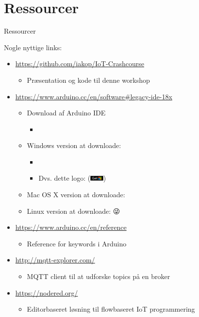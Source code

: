 \documentclass[aspectratio=169]{beamer}
\begin{document}
\section{Ressourcer}
\begin{frame}{Ressourcer}
	\begin{textBox}
	Nogle nyttige links:
		\begin{itemize}
			\item \url{https://github.com/iakop/IoT-Crashcourse}
			\begin{itemize}
				\item Præsentation og kode til denne workshop
			\end{itemize}
			\item \url{https://www.arduino.cc/en/software\#legacy-ide-18x}
			\begin{itemize}
				\item Download af Arduino IDE 
				\begin{itemize}
					\item {}
				\end{itemize}
				\item Windows version at downloade:  
				\begin{itemize}
					\item {}
					\item Dvs.  dette logo: (\includegraphics[height=8pt, keepaspectratio=true]{assets/pictures/windows-get.png})
				\end{itemize}
				\item Mac OS X version at downloade:  
				\item Linux version at downloade: \color{arduinoBlue}😜%
			\end{itemize}
			\item \url{https://www.arduino.cc/en/reference}
			\begin{itemize}
				\item Reference for keywords i Arduino
			\end{itemize}
			\item \url{http://mqtt-explorer.com/}
			\begin{itemize}
				\item MQTT client til at udforske topics på en broker
			\end{itemize}
			\item \url{https://nodered.org/}
			\begin{itemize}
				\item Editorbaseret løsning til flowbaseret IoT programmering
			\end{itemize}
		\end{itemize}
	\end{textBox}
\end{frame}
\end{document}
